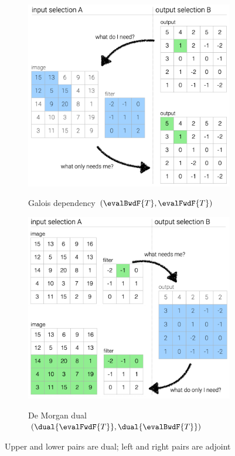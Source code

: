 \begin{figure}
   \begin{subfigure}{0.53\textwidth}
      {\includegraphics[scale=0.39]{fig/example/4-relations-1.png}}
      \vspace{2mm}
      \caption{Galois dependency $(\evalBwdF{T}, \evalFwdF{T})$}
      \label{fig:example:convolve-viz:galois-dependency}
   \end{subfigure}
   \begin{subfigure}{0.46\textwidth}
      {\includegraphics[scale=0.39]{fig/example/4-relations-2.png}}
      \vspace{2mm}
      \caption{De Morgan dual $(\dual{\evalFwdF{T}}, \dual{\evalBwdF{T}})$}
      \label{fig:example:convolve-viz:de-morgan-dual}
   \end{subfigure}
   \vspace{-3mm}
   \caption{Upper and lower pairs are dual; left and right pairs are adjoint}
   \label{fig:example:convolve-viz}
\end{figure}

